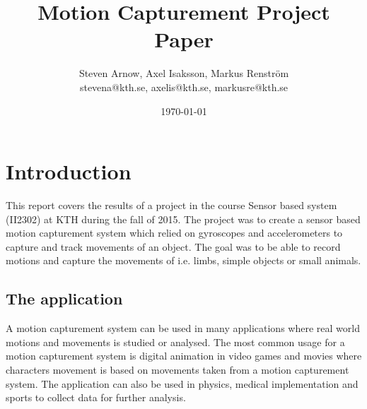 \documentclass[a4paper, 12pt]{article}
\title{Motion Capturement Project Paper}
\author{Steven Arnow, Axel Isaksson, Markus Renström\\stevena@kth.se, axelis@kth.se, markusre@kth.se}
\date{\today{}}
\begin{document}
\maketitle







\section*{Introduction}
This report covers the results of a project in the course Sensor based system (II2302) at KTH during the fall of 2015\cite{kursp}. The project was to create a sensor based motion capturement system which relied on gyroscopes and accelerometers to capture and track movements of an object. The goal was to be able to record motions and capture the movements of i.e. limbs, simple objects or small animals.

\subsection*{The application}
A motion capturement system \cite{wiki} can be used in many applications where real world motions and movements is studied or analysed. The most common usage for a motion capturement system is digital animation in video games and movies where characters movement is based on movements taken from a motion capturement system. The application can also be used in physics, medical implementation and sports to collect data for further analysis.
\end{document}
